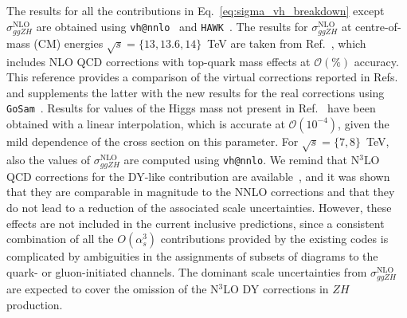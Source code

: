 The results for all the contributions in Eq.~\eqref{eq:sigma_vh_breakdown} except $\sigma^\mathrm{NLO}_{ggZH}$ are obtained using \texttt{vh@nnlo}~\cite{Brein:2012ne, Harlander:2018yio} and \texttt{HAWK}~\cite{Denner:2011id,Denner:2014cla}. The results for $\sigma^\mathrm{NLO}_{ggZH}$ at centre-of-mass (CM) energies $\sqrt{s}=\{13, 13.6, 14\}$~TeV are taken from Ref.~\cite{CampilloAveleira:2025rbh}, which includes NLO QCD corrections with top-quark mass effects at $\mathcal{O}(\%)$ accuracy. This reference provides a comparison of the virtual corrections reported in Refs.~\cite{Chen:2022rua,Degrassi:2022mro} and supplements the latter with the new results for the real corrections using \texttt{GoSam}~\cite{Braun:2025afl}. Results for values of the Higgs mass not present in Ref.~\cite{CampilloAveleira:2025rbh} have been obtained with a linear interpolation, which is accurate at $\mathcal{O}(10^{-4})$, given the mild dependence of the cross section on this parameter. For $\sqrt{s}=\{7, 8\}$~TeV, also the values of $\sigma^\mathrm{NLO}_{ggZH}$ are computed using \texttt{vh@nnlo}.  We remind that N$^3$LO QCD corrections for the DY-like contribution are available~\cite{Baglio:2022wzu}, and it was shown that they are comparable in magnitude to the NNLO corrections and that they do not lead to a reduction of the associated scale uncertainties. However, these effects are not included in the current inclusive predictions, since a consistent combination of all the $O(\alpha_s^3)$ contributions provided by the existing codes is complicated by ambiguities in the assignments of subsets of diagrams to the quark- or gluon-initiated channels. The dominant scale uncertainties from $\sigma^\mathrm{NLO}_{ggZH}$ are expected to cover the omission of the N$^3$LO DY corrections in $ZH$ production.

